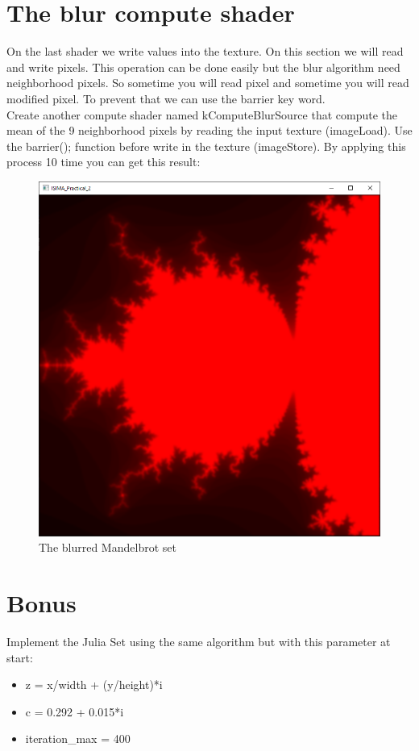 \documentclass{article}
\begin{document}
\section{The blur compute shader}
On the last shader we write values into the texture. On this section we will read and write pixels. This operation can be done easily but the blur algorithm need neighborhood pixels. So sometime you will read pixel and sometime you will read modified pixel. To prevent that we can use the barrier key word.\\
Create another compute shader named kComputeBlurSource that compute the mean of the 9 neighborhood pixels by reading the input texture (imageLoad). Use the barrier(); function before write in the texture (imageStore).
By applying this process 10 time you can get this result:
\begin{figure}[H]
	\centering
	\includegraphics[scale=0.6]{images/Mandelbrot_blur.png}
	\caption{The blurred Mandelbrot set}
\end{figure}

\section{Bonus}
Implement the Julia Set using the same algorithm but with this parameter at start:
\begin{itemize}
	\item z = x/width + (y/height)*i
	\item c = 0.292 + 0.015*i
	\item iteration\_max = 400
\end{itemize}
\end{document}
